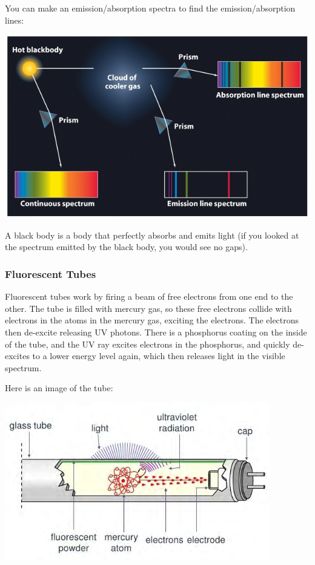 \documentclass[a4paper, 12pt]{article}
\begin{document}
You can make an emission/absorption spectra to find the emission/absorption lines:

\includegraphics[width=\textwidth]{images/spectraElecEmmision.jpg}

A black body is a body that perfectly absorbs and emits light (if you looked at the spectrum emitted by the black body, you would see no gaps).

\subsubsection{Fluorescent Tubes}

Fluorescent tubes work by firing a beam of free electrons from one end to the other.
The tube is filled with mercury gas, so these free electrons collide with electrons in the atoms in the mercury gas, exciting the electrons. The electrons then de-excite releasing UV photons. There is a phosphorus coating on the inside of the tube, and the UV ray excites electrons in the phosphorus, and quickly de-excites to a lower energy level again, which then releases light in the visible spectrum.

Here is an image of the tube:

\includegraphics[width=\textwidth]{images/mercuryTube.png}
\end{document}
